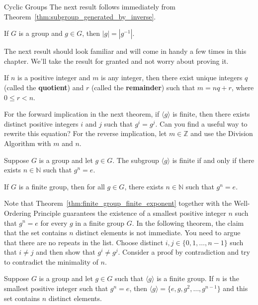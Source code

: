 \begin{section}{Cyclic Groups}
The next result follows immediately from Theorem~\ref{thm:subgroup_generated_by_inverse}.

\begin{theorem}
If $G$ is a group and $g\in G$, then $|g|=|g^{-1}|$.
\end{theorem}

The next result should look familiar and will come in handy a few times in this chapter. We'll take the result for granted and not worry about proving it.

\begin{theorem}
If $n$ is a positive integer and $m$ is any integer, then there exist unique integers $q$ (called the \textbf{quotient}) and $r$ (called the \textbf{remainder}) such that $m=nq+r$, where $0\leq r<n$.
\end{theorem}

For the forward implication in the next theorem, if $\langle g\rangle$ is finite, then there exists distinct positive integers $i$ and $j$ such that $g^i=g^j$.  Can you find a useful way to rewrite this equation? For the reverse implication, let $m\in\mathbb{Z}$ and use the Division Algorithm with $m$ and $n$.

\begin{theorem}\label{thm:finite_group_finite_exponent}
Suppose $G$ is a group and let $g\in G$. The subgroup $\langle g\rangle$ is finite if and only if there exists $n\in\mathbb{N}$ such that $g^n=e$.
\end{theorem}

\begin{corollary}\label{cor:finite_group_finite_exponent}
If $G$ is a finite group, then for all $g\in G$, there exists $n\in\mathbb{N}$ such that $g^n=e$.
\end{corollary}

Note that Theorem~\ref{thm:finite_group_finite_exponent} together with the Well-Ordering Principle guarantees the existence of a smallest positive integer $n$ such that $g^n=e$ for every $g$ in a finite group $G$. In the following theorem, the claim that the set contains $n$ distinct elements is not immediate.  You need to argue that there are no repeats in the list. Choose distinct $i,j\in\{0,1,\ldots,n-1\}$ such that $i\neq j$ and then show that $g^i\neq g^j$.  Consider a proof by contradiction and try to contradict the minimality of $n$.

\begin{theorem}
Suppose $G$ is a group and let $g\in G$ such that $\langle g\rangle$ is a finite group. If $n$ is the smallest positive integer such that $g^n=e$, then $\langle g\rangle = \{e, g, g^2, \ldots, g^{n-1}\}$ and this set contains $n$ distinct elements.
\end{theorem}


\end{section}
